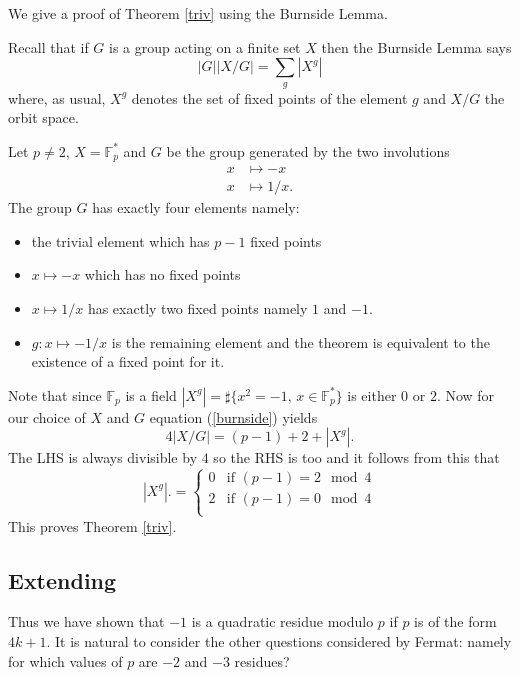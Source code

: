 \documentclass[12pt,a4paper]{amsart}
\def\fp{\mathbb{F}_p}
\begin{document}
We give a proof of Theorem \ref{triv} using the Burnside Lemma.


Recall that if $G$ is  a group acting on a finite set $X$ then the Burnside Lemma says
\begin{equation}\label{burnside}
|G| |X/G| = \sum_{g} |X^g| 
\end{equation}  
where, as usual, 
 $X^g$ denotes the set of fixed points of the element $g$ 
 and $X/G$  the orbit space.

Let $p\neq 2$,  $X = \fp^*$ and $G$ be the group generated by the two involutions
\begin{eqnarray*}
x & \mapsto -x \\
x & \mapsto 1/x.
\end{eqnarray*}
The group  $G$ has exactly four elements namely:
\begin{itemize}
\item the trivial element which has  $p-1$ fixed points
\item $x\mapsto -x$ which has no fixed points 
\item  $x\mapsto 1/x$ has exactly two fixed points namely $1$ and $-1$.
\item  $g:x \mapsto -1/x$ is the remaining element and the theorem is equivalent to the existence of a fixed point for it.
\end{itemize}
Note that since $\fp$ is a field 
$|X^g| = \sharp \{x^2 = -1, \, x\in \fp^* \}$
is either $0$ or $2$.
Now for our choice of $X$ and $G$ equation (\ref{burnside}) yields
\begin{equation}
4 |X/G|   = (p-1) + 2 + |X^g|.
\end{equation}  
The LHS is always divisible by $4$ so the  RHS is too and
it follows from this that
$$ |X^g|. = \left\{  \begin{array}{ll}
		0 & \text{if }(p-1) =  2 \mod 4 \\
2 & \text{if }(p-1) =  0 \mod 4 \\
\end{array}
\right.
$$
This proves Theorem \ref{triv}.

\subsection{Extending}\label{extending}

Thus we have shown that $-1$ is a quadratic residue modulo $p$ if
$p$ is of the form $4k+1$. 
It is natural to consider the other questions considered by Fermat:
namely for which values of $p$ are $-2$ and $-3$ residues?
\end{document}
